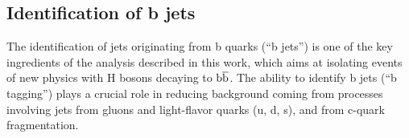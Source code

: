 
\subsection{Identification of b jets}\label{subsec:bjets}

The identification of jets originating from b quarks (``b jets'') is one of the key ingredients of the analysis described in this work, which aims at isolating events of new physics with H bosons decaying to ${\mathrm{b}\overline{\mathrm{b}}}$. The ability to identify b jets (``b tagging'') plays a crucial role in reducing background coming from processes involving jets from gluons and light-flavor quarks (u, d, s), and from c-quark fragmentation.

